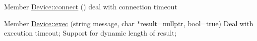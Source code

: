 
\begin{DoxyRefList}
\item[Member \mbox{\hyperlink{class_device_ad2b9f59ad977879bd6314258b2080d27}{Device\+::connect}} ()]\label{todo__todo000001}%
%
deal with connection timeout  
\item[Member \mbox{\hyperlink{class_device_aade23adf20b97f22c1039fa02ea2fca9}{Device\+::exec}} (string message, char $\ast$result=nullptr, bool=true)]\label{todo__todo000002}%
%
Deal with execution timeout; Support for dynamic length of result; 
\end{DoxyRefList}
